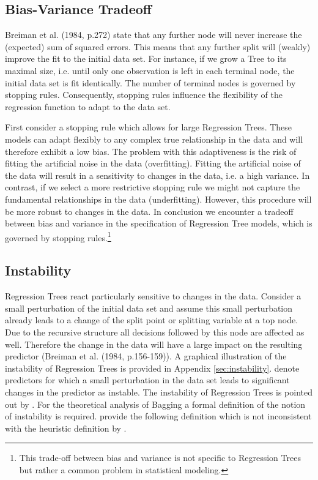 \subsection{Bias-Variance Tradeoff} \label{sec:BiasVariance}
Breiman et al. (1984, p.272) state that any further node will never increase the (expected) sum of squared errors. This means that any further split will (weakly) improve the fit to the initial data set. For instance, if we grow a Tree to its maximal size, i.e. until only one observation is left in each terminal node, the initial data set is fit identically. The number of terminal nodes is governed by stopping rules. Consequently, stopping rules influence the flexibility of the regression function to adapt to the data set.

First consider a stopping rule which allows for large Regression Trees. These models can adapt flexibly to any complex true relationship in the data and will therefore exhibit a low bias. The problem with this adaptiveness is the risk of fitting the artificial noise in the data (overfitting). Fitting the artificial noise of the data will result in a sensitivity to changes in the data, i.e. a high variance. In contrast, if we select a more restrictive stopping rule we might not capture the fundamental relationships in the data (underfitting). However, this procedure will be more robust to changes in the data. In conclusion we encounter a tradeoff between bias and variance in the specification of Regression Tree models, which is governed by stopping rules.\footnote{This trade-off between bias and variance is not specific to Regression Trees but rather a common problem in statistical modeling.}

\subsection{Instability}\label{sec:stability}
Regression Trees react particularly sensitive to changes in the data. Consider a small perturbation of the initial data set and assume this small perturbation already leads to a change of the split point or splitting variable at a top node. Due to the recursive structure all decisions followed by this node are affected as well. Therefore the change in the data will have a large impact on the resulting predictor (Breiman et al. (1984, p.156-159)). A graphical illustration of the instability of Regression Trees is provided in Appendix \ref{sec:instability}. \cite{Breiman1996} denote predictors for which a small perturbation in the data set leads to significant changes in the predictor as instable. The instability of Regression Trees is pointed out by \cite{breiman1996B}. For the theoretical analysis of Bagging a formal definition of the notion of instability is required. \cite{Buhlmann2002} provide the following definition which is not inconsistent with the heuristic definition by \cite{breiman1996B}.

